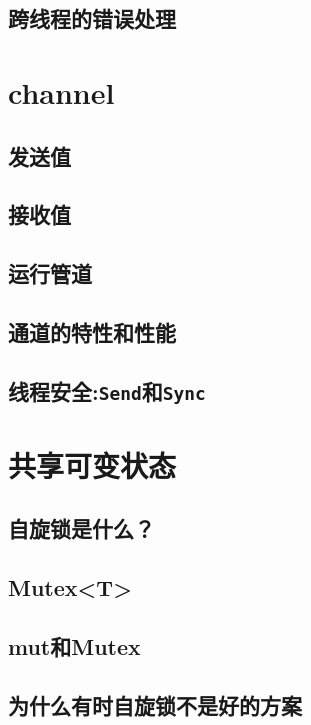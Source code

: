 \subsection{跨线程的错误处理}

\section{channel}

\subsection{发送值}

\subsection{接收值}

\subsection{运行管道}

\subsection{通道的特性和性能}

\subsection{线程安全:\texttt{Send}和\texttt{Sync}}\label{threadsafe}

\section{共享可变状态}

\subsection{自旋锁是什么？}

\subsection{Mutex<T>}\label{mutex}

\subsection{mut和Mutex}

\subsection{为什么有时自旋锁不是好的方案}

